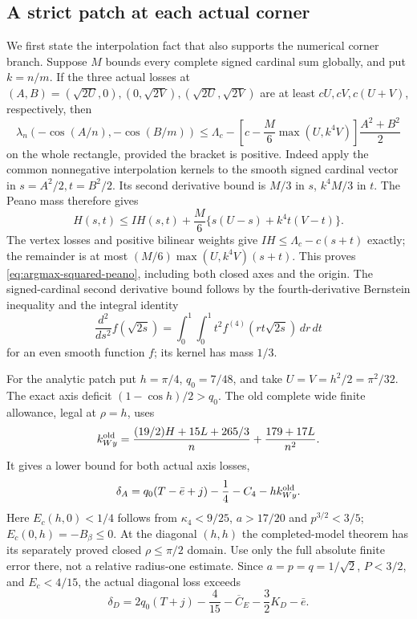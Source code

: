 \subsection{A strict patch at each actual corner}

We first state the interpolation fact that also supports the numerical
corner branch.  Suppose $M$ bounds every complete signed cardinal sum
globally, and put $k=n/m$.  If the three actual losses at
$(A,B)=(\sqrt{2U},0),(0,\sqrt{2V}),(\sqrt{2U},\sqrt{2V})$ are at least
$cU,cV,c(U+V)$, respectively, then
\begin{equation}
 \lambda_n(-\cos(A/n),-\cos(B/m))
 \leq\Lambda_c-\left[c-\frac M6\max(U,k^4V)\right]\frac{A^2+B^2}{2}
                                                        \label{eq:argmax-squared-peano}
\end{equation}
on the whole rectangle, provided the bracket is positive.
Indeed apply the common nonnegative interpolation kernels to the
smooth signed cardinal vector in $s=A^2/2,t=B^2/2$.  Its second
derivative bound is $M/3$ in $s$, $k^4M/3$ in $t$.  The Peano mass
therefore gives
\[
 H(s,t)\leq I H(s,t)+\frac M6\{s(U-s)+k^4t(V-t)\}.
\]
The vertex losses and positive bilinear weights give
$I H\leq\Lambda_c-c(s+t)$ exactly; the remainder is at most
$(M/6)\max(U,k^4V)(s+t)$.  This proves
\eqref{eq:argmax-squared-peano}, including both closed axes and the
origin.  The signed-cardinal second derivative bound follows by the
fourth-derivative Bernstein inequality and the integral identity
\[
 \frac{d^2}{ds^2}f(\sqrt{2s})
 =\int_0^1\int_0^1 t^2 f^{(4)}(rt\sqrt{2s})\,dr\,dt
\]
for an even smooth function $f$; its kernel has mass $1/3$.

For the analytic patch put $h=\pi/4$, $q_0=7/48$, and take
$U=V=h^2/2=\pi^2/32$.  The exact axis deficit
$(1-\cos h)/2>q_0$.  The old complete wide finite allowance, legal at
$\rho=h$, uses
\[
 k_{Wy}^{\rm old}
 =\frac{(19/2)H+15L+265/3}{n}+\frac{179+17L}{n^2}.
\]
It gives a lower bound for both actual axis losses,
\[
 \delta_A=q_0(T-\bar e+j)-\frac14-C_4-hk_{Wy}^{\rm old}.
\]
Here $E_c(h,0)<1/4$ follows from $\kappa_4<9/25$,
$a>17/20$ and $p^{3/2}<3/5$; $E_c(0,h)=-B_\beta\leq0$.
At the diagonal $(h,h)$ the completed-model theorem has its separately
proved closed $\rho\leq\pi/2$ domain.  Use only the full absolute
finite error there, not a relative radius-one estimate.  Since
$a=p=q=1/\sqrt2$, $P<3/2$, and $E_c<4/15$, the actual diagonal
loss exceeds
\[
 \delta_D=2q_0(T+j)-\frac4{15}-\overline C_E-\frac32K_D-\bar e.
\]

